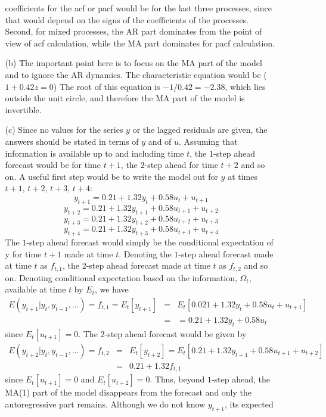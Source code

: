 \documentclass[11pt,a4paper]{article}
\begin{document}
\begin{itemize}
\begin{itemize}
coefficients for the acf or pacf would be for the last three processes, since
that would depend on the signs of the coefficients of the processes. Second,
for mixed processes, the AR part dominates from the point of view of acf
calculation, while the MA part dominates for pacf calculation.
\item[(b)]
The important point here is to focus on the MA part of the model and to
ignore the AR dynamics. The characteristic equation would be ($1+0.42z = 0$) The
root of this equation is $-1/0.42 = -2.38$, which lies outside the unit circle,
and therefore the MA part of the model is invertible.
\item[(c)]
Since no values for
 the series $y$ or the lagged residuals are given, the answers should be stated
in terms of $y$ and of $u$. Assuming that information is available up to and
including time $t$, the $1$-step ahead forecast would be for time
$t+1$, the $2$-step
ahead for time $t+2$ and so on. A useful first step would be to write the model
out for $y$ at times $t+1$, $t+2$, $t+3$, $t+4$:
$$
y_{t +1} = 0.21 + 1.32 y_t + 0.58 u_t + u_{t +1}
$$
$$
y_{t + 2} = 0.21 + 1.32 y_{t +1} +  0.58 u_{t +1} + u_{t + 2}
$$
$$
 y_{t +3} = 0.21 + 1.32 y_{t + 2} + 0.58 u_{t + 2} + u_{t +3}
$$
$$
y_{t + 4} = 0.21 + 1.32 y_{t +3} + 0.58 u_{t +3} + u_{t + 4}
$$
The $1$-step ahead forecast
would simply be the conditional expectation of y for time $t+1$ made at time
$t$.
Denoting the $1$-step ahead forecast made at time $t$ as $f_{t,1}$, the $2$-step ahead
forecast made at time $t$ as $f_{t,2}$ and so on. Denoting
conditional expectation based on the information, $\Omega_t$, available
at time $t$ by  $E_{t}$, we have
$$
\begin{array}{rcl}
E( y_{t +1}| y_{t}, y_{t -1} , \ldots) = f_{t,1} = E_t [ y_{t +1} ] & = & E_t [0.021 + 1.32 y_t + 0.58u_t + u_{t +1} ] \\
 & = & = 0.21 + 1.32 y_t + 0.58u_t
\end{array}
$$
since $E_t[u_{t+1}]=0$.
The 2-step ahead forecast would be given by
$$
\begin{array}{rcl}
E ( y_{t + 2}| y_t , y_{t -1}, \ldots) = f_{t,2} & = & E_t [ y_{t + 2} ]
= E_t [0.21 + 1.32 y_{t +1} + 0.58u_{t +1} + u_{t + 2} ] \\
& = & 0.21 + 1.32 f_{t,1}
\end{array}
$$
since $E_t[u_{t+1}]=0$ and $E_t[u_{t+2}]=0$. Thus, beyond $1$-step ahead, the
 MA($1$) part of the model disappears from the forecast and only the
autoregressive part remains. Although we do not know $y_{t+1}$, its expected

\end{itemize}
\end{itemize}
\end{document}
